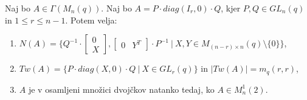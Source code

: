 \documentclass[mat1, tisk]{fmfdelo}
\begin{document}
\begin{lema}\label{lema4.4}
  Naj bo $A \in \Gamma(M_n(q))$. Naj bo $A = P \cdot diag(I_r, 0) \cdot Q$, 
  kjer $P, Q \in GL_n(q)$ in $1 \leq r \leq n-1$. Potem velja:
  \begin{enumerate}[label=({\alph*})]
    \item $N(A) = \{Q^{-1} \cdot 
    \begin{bmatrix}
      0 \\
      X
    \end{bmatrix}, 
    \begin{bmatrix}
      0 & Y^T
    \end{bmatrix} \cdot P^{-1}
    ~|~ X, Y \in M_{(n-r) \times n}(q)\setminus\{0\}\}$,
    \item $Tw(A) = \{P \cdot diag(X,0) \cdot Q~|~ X \in GL_r(q)\}$ in $|Tw(A)| = m_q(r,r)$,
    \item $A$ je v osamljeni množici dvojčkov natanko tedaj, ko $A \in {M}_n^1(2)$.
  \end{enumerate}
\end{lema}
\end{document}
